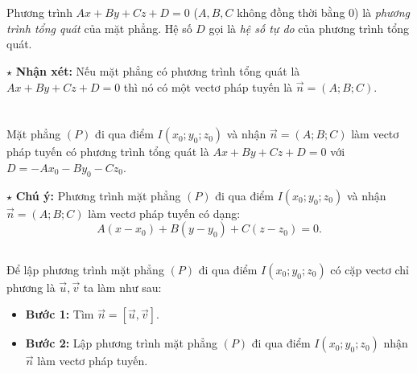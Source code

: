 \documentclass[12pt,a4paper]{extarticle}
\begin{document}
\section*{\color{myblue}{II. Phương trình tổng quát của mặt phẳng}}
\begin{tcolorbox}[colback=lightblue, colframe=myblue, arc=2mm]
Phương trình $Ax + By + Cz + D = 0$ ($A, B, C$ không đồng thời bằng $0$) là \textit{phương trình tổng quát} của mặt phẳng. Hệ số $D$ gọi là \textit{hệ số tự do} của phương trình tổng quát.
\end{tcolorbox}
\noindent $\star$ \textbf{Nhận xét:} Nếu mặt phẳng có phương trình tổng quát là $Ax + By + Cz + D = 0$ thì nó có một vectơ pháp tuyến là $\vec{n} = (A; B; C)$.
\vspace{0.4cm}
\section*{\color{myblue}{III. Lập phương trình tổng quát của mặt phẳng biết một số điều kiện}}
\subsection*{\color{myblue}{1. Đi qua một điểm và biết số vectơ pháp tuyến}}
\begin{tcolorbox}[colback=lightblue, colframe=myblue, arc=2mm]
Mặt phẳng $(P)$ đi qua điểm $I(x_0; y_0; z_0)$ và nhận $\vec{n} = (A; B; C)$ làm vectơ pháp tuyến có phương trình tổng quát là $Ax + By + Cz + D = 0$ với $D = -Ax_0 - By_0 - Cz_0$.
\end{tcolorbox}
\noindent $\star$ \textbf{Chú ý:} Phương trình mặt phẳng $(P)$ đi qua điểm $I(x_0; y_0; z_0)$ và nhận $\vec{n} = (A; B; C)$ làm vectơ pháp tuyến có dạng:
\[
A(x - x_0) + B(y - y_0) + C(z - z_0) = 0.
\]
\subsection*{\color{myblue}{2. Đi qua một điểm và biết cặp vectơ chỉ phương}}
Để lập phương trình mặt phẳng $(P)$ đi qua điểm $I(x_0; y_0; z_0)$ có cặp vectơ chỉ phương là $\vec{u}, \vec{v}$ ta làm như sau:
\begin{itemize}
    \item[\textbf{•}] \textbf{Bước 1:} Tìm $\vec{n} = [\vec{u}, \vec{v}]$.
    \item[\textbf{•}] \textbf{Bước 2:} Lập phương trình mặt phẳng $(P)$ đi qua điểm $I(x_0; y_0; z_0)$ nhận $\vec{n}$ làm vectơ pháp tuyến.
\end{itemize}
\end{document}

